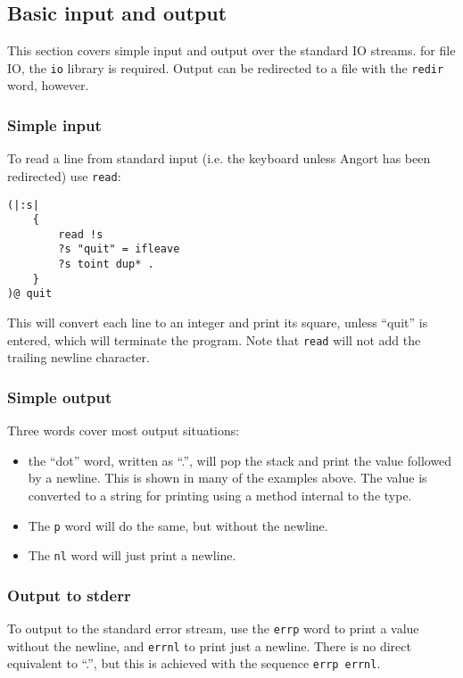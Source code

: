 \subsection{Basic input and output}
This section covers simple input and output over the standard IO streams.
for file IO, the \texttt{io} library is required. Output can be redirected
to a file with the \texttt{redir} word, however.

\subsubsection{Simple input}
To read a line from standard input (i.e. the keyboard unless Angort
has been redirected) use \texttt{read}:
\begin{lstlisting}
(|:s|
    {
        read !s
        ?s "quit" = ifleave
        ?s toint dup* .
    }
)@ quit
\end{lstlisting}
This will convert each line to an integer and print its square,
unless ``quit'' is entered, which will terminate the program.
Note that \texttt{read} will not add the trailing newline character.

\subsubsection{Simple output}
Three words cover most output situations:
\begin{itemize}
\item the ``dot'' word, written as ``.'', will pop the stack and print
the value followed by a newline. This is shown in many of the examples
above. The value is converted to a string for printing using a method
internal to the type.
\item The \texttt{p} word will do the same, but without the newline.
\item The \texttt{nl} word will just print a newline.
\end{itemize}

\subsubsection{Output to stderr}
To output to the standard error stream, use the \texttt{errp} word
to print a value without the newline, and \texttt{errnl} to print just
a newline. There is no direct equivalent to ``.'', but this is achieved
with the sequence \texttt{errp errnl}.


